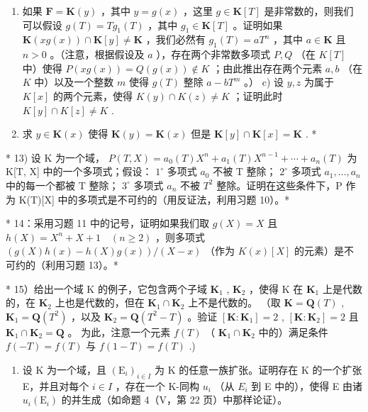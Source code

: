 \begin{enumerate}
\def\labelenumi{\alph{enumi})}
\setcounter{enumi}{1}
\item
  如果 \(\mathbf{F} = \mathbf{K}(y)\) ，其中 \(y = g(x)\) ，这里 \(g \in \mathbf{K}[T]\) 是非常数的，则我们可以假设 \(g(T) = Tg_1(T)\) ，其中 \(g_1 \in \mathbf{K}[T]\) 。证明如果 \(\mathbf{K}(xg(x)) \cap \mathbf{K}[y] \neq \mathbf{K}\) ，我们必然有 \(g_1(T) = aT^n\) ，其中 \(a \in \mathbf{K}\) 且 \(n > 0\) 。（注意，根据假设及 \(a\) ），存在两个非常数多项式 \(P, Q\) （在 \(K[T]\) 中）使得 \(P(xg(x)) = Q(g(x)) \notin K\) ；由此推出存在两个元素 \(a, b\) （在 \(K\) 中）以及一个整数 \(m\) 使得 \(g(T)\) 整除 \(a - bT^m\) 。） c) 设 \(y, z\) 为属于 \(K[x]\) 的两个元素，使得 \(K(y) \cap K(z) \neq K\) ；证明此时 \(K[y] \cap K[z] \neq K\) .
\item
  求 \(y \in \mathbf{K}(x)\) 使得 \(\mathbf{K}(y) = \mathbf{K}(x)\) 但是 \(\mathbf{K}[y] \cap \mathbf{K}[x] = \mathbf{K}\) . *
\end{enumerate}

* 13) 设 K 为一个域， \(P(T, X) = a_0(T)X^n + a_1(T)X^{n-1} + \cdots + a_n(T)\) 为 K{[}T, X{]} 中的一个多项式；假设： \(1^\circ\) 多项式 \(a_0\) 不被 T 整除； \(2^\circ\) 多项式 \(a_1, \ldots, a_n\) 中的每一个都被 T 整除； \(3^\circ\) 多项式 \(a_n\) 不被 \(T^2\) 整除。证明在这些条件下，P 作为 K(T){[}X{]} 中的多项式是不可约的（用反证法，利用习题 10）。*

* 14：采用习题 11 中的记号，证明如果我们取 \(g(X) = X\) 且 \(h(X) = X^n + X + 1 \quad (n \geqslant 2)\) ，则多项式 \((g(X)h(x) - h(X)g(x)) / (X - x)\) （作为 \(K(x)[X]\) 的元素）是不可约的（利用习题 13）。*

* 15）给出一个域 K 的例子，它包含两个子域 \(\mathbf{K}_1\) , \(\mathbf{K}_2\) ，使得 K 在 \(\mathbf{K}_1\) 上是代数的，在 \(\mathbf{K}_2\) 上也是代数的，但在 \(\mathbf{K}_1 \cap \mathbf{K}_2\) 上不是代数的。 （取 \(\mathbf{K} = \mathbf{Q}(T)\) , \(\mathbf{K}_1 = \mathbf{Q}(T^2)\) ，以及 \(\mathbf{K}_2 = \mathbf{Q}(T^2 - T)\) 。验证 \([\mathbf{K} : \mathbf{K}_1] = 2\) , \([\mathbf{K} : \mathbf{K}_2] = 2\) 且 \(\mathbf{K}_1 \cap \mathbf{K}_2 = \mathbf{Q}\) 。 为此，注意一个元素 \(f(T)\) （ \(\mathbf{K}_1 \cap \mathbf{K}_2\) 中的）满足条件 \(f(-T) = f(T)\) 与 \(f(1 - T) = f(T)\) .)

\BourbakiExerciseGroup

\begin{enumerate}
\def\labelenumi{\arabic{enumi})}
\tightlist
\item
  设 K 为一个域，且 \((\mathrm{E}_{i})_{i\in I}\) 为 K 的任意一族扩张。证明存在 K 的一个扩张 E，并且对每个 \(i\in I\) ，存在一个 K-同构 \(u_{i}\) （从 \(E_{i}\) 到 E 中的），使得 E 由诸 \(u_{i}(\mathrm{E}_{i})\) 的并生成（如命题 4（V，第 22 页）中那样论证）。
\end{enumerate}

